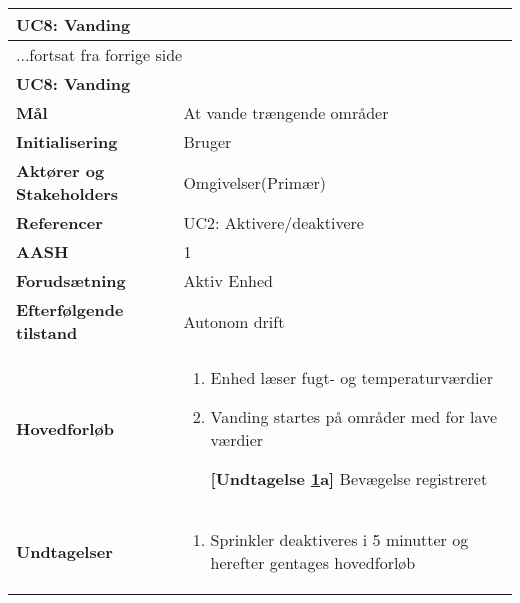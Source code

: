 \begin{center} \centering \label{UC8} 
	\begin{longtable}{|p{5cm}|p{9cm}|}  %
	\hline
		\multicolumn{2}{|l|}{\textbf{UC8: Vanding}} 		\\\hline %
		\endfirsthead
		
		\multicolumn{2}{l}{...fortsat fra forrige side} 	\\ \hline %
		\multicolumn{2}{|l|}{\textbf{UC8: Vanding}} 		\\\hline %
		\endhead	
		
		\textbf{Mål}								&At vande trængende områder	\\\hline
		\textbf{Initialisering}					&Bruger						\\\hline
		\textbf{Aktører og Stakeholders}			&Omgivelser(Primær)			\\\hline
		\textbf{Referencer}						&UC2: Aktivere/deaktivere 	\\\hline
		\textbf{AASH}							&1							\\\hline
		\textbf{Forudsætning}					&Aktiv Enhed					\\\hline
		\textbf{Efterfølgende tilstand}			&Autonom drift				\\\hline
		\textbf{Hovedforløb}					
			&\begin{enumerate}
				
				\item Enhed læser fugt- og temperaturværdier
				
				\item \label{uc8sprinkler} Vanding startes på områder med for lave værdier
				
					\textbf{[Undtagelse \ref{uc8sprinkler}a]} Bevægelse registreret
	
			\end{enumerate}\\\hline

		\textbf{Undtagelser}
			&\begin{enumerate}[label=\ref{uc8sprinkler}a.]
			
				\item Sprinkler deaktiveres i 5 minutter	og herefter gentages hovedforløb	
			
			\end{enumerate}\\\hline
	\end{longtable}
\end{center}

